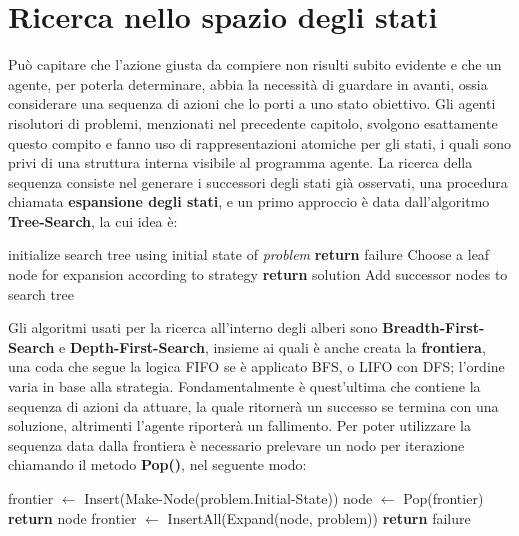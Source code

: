 \section{Ricerca nello spazio degli stati}
Può capitare che l'azione giusta da compiere non risulti subito evidente e che un agente, per poterla determinare, abbia la necessità di guardare in
avanti, ossia considerare una sequenza di azioni che lo porti a uno stato obiettivo. Gli agenti risolutori di problemi, menzionati nel precedente
capitolo, svolgono esattamente questo compito e fanno uso di rappresentazioni atomiche per gli stati, i quali sono privi di una struttura interna
visibile al programma agente. La ricerca della sequenza consiste nel generare i successori degli stati già osservati, una procedura chiamata
\textbf{espansione degli stati}, e un primo approccio è data dall'algoritmo \textbf{Tree-Search}, la cui idea è: \begin{algorithm}[h]
    \caption{Abstract-Tree-Search(problem, strategy) \textbf{returns} solution or failure}
    \begin{algorithmic}[i]
        \State initialize search tree using initial state of \textit{problem}
        \Loop
             \textbf{return} failure
            \EndIf
            \State Choose a leaf node for expansion according to strategy
             \textbf{return} solution 
            \Else \text{ }Add successor nodes to search tree
            \EndIf
        \EndLoop
    \end{algorithmic}
\end{algorithm}

\noindent Gli algoritmi usati per la ricerca all'interno degli alberi sono \textbf{Breadth-First-Search} e \textbf{Depth-First-Search}, insieme ai
quali è anche creata la \textbf{frontiera}, una coda che segue la logica FIFO se è applicato BFS, o LIFO con DFS; l'ordine varia in base alla strategia.
Fondamentalmente è quest'ultima che contiene la sequenza di azioni da attuare, la quale ritornerà un successo se termina con una soluzione, altrimenti
l'agente riporterà un fallimento. Per poter utilizzare la sequenza data dalla frontiera è necessario prelevare un nodo per iterazione chiamando il
metodo \textbf{Pop()}, nel seguente modo: \begin{algorithm}[h]
    \caption{Tree-Search(problem, frontier) \textbf{return} solution or failure}
    \begin{algorithmic}[i]
        \State frontier $\gets$ Insert(Make-Node(problem.Initial-State))
            \State node $\gets$ Pop(frontier)
             \textbf{return} node
            \EndIf
            \State frontier $\gets$ InsertAll(Expand(node, problem))
        \EndWhile
        \State \textbf{return} failure
    \end{algorithmic}    
\end{algorithm}


